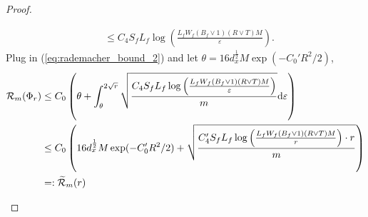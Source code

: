 \documentclass[11pt]{article}
\numberwithin{equation}{section}
\renewcommand{\eqref}[1]{(\ref{#1})}
\begin{document}
\begin{proof}
\begin{enumerate}[label=\textbf{Step \arabic*.}]
\begin{equation}
\begin{aligned}
                    &\leq C_4S_fL_f\log\left(\frac{L_fW_f(B_f\vee 1)(R\vee T)M}{\varepsilon}\right).
                \end{aligned}
            \end{equation}
            Plug in \eqref{eq:rademacher_bound_2} and let $\theta=16d_x^{\frac{1}{2}}M\exp(-C_0'R^2/2)$,
            \begin{equation}
                \begin{aligned}
                    \mathcal{R}_m(\Phi_r)
                    &\leq C_0\left(\theta+\int_\theta^{2\sqrt{r}}\sqrt{\frac{C_4S_fL_f\log\left(\frac{L_fW_f(B_f\vee 1)(R\vee T)M}{\varepsilon}\right)}{m}}\mathrm{d}\varepsilon\right) \\
                    &\leq C_0\left(16d_x^{\frac{1}{2}}M\exp(-C_0'R^2/2)+\sqrt{\frac{C_4'S_fL_f\log\left(\frac{L_fW_f(B_f\vee 1)(R\vee T)M}{r}\right)\cdot r}{m}}\right) \\
                    &=: \widetilde{\mathcal{R}}_m(r)
                \end{aligned}
            \end{equation}
    \end{enumerate}
    

\end{proof}
\end{document}

